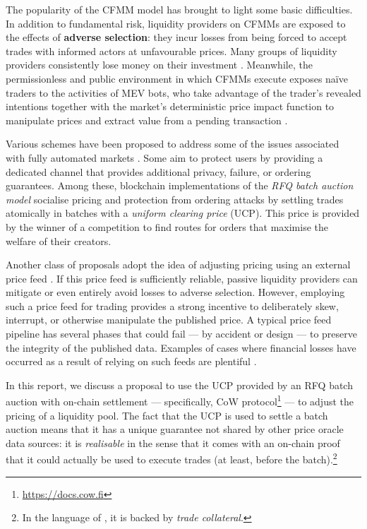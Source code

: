 \documentclass[a4paper,10pt]{article}
\theoremstyle{remark}
\begin{document}
The popularity of the CFMM model has brought to light some basic difficulties.
%
In addition to fundamental risk, liquidity providers on CFMMs are exposed to the effects of \textbf{adverse selection}: they incur losses from being forced to accept trades with informed actors at unfavourable prices.  
%
Many groups of liquidity providers consistently lose money on their investment \cite{loesch2021impermanent}.
%
Meanwhile, the permissionless and public environment in which CFMMs execute exposes na\"ive traders to the activities of MEV bots, who take advantage of the trader's revealed intentions together with the market's deterministic price impact function to manipulate prices and extract value from a pending transaction \cite{zhou2021high, holloway2023value}.

Various schemes have been proposed to address some of the issues associated with fully automated markets \cite{ferreira2022credible, josojo2022mev, nikete2022towards, fleupold2022cow}.
%
Some aim to protect users by providing a dedicated channel that provides additional privacy, failure, or ordering guarantees.
%
Among these, blockchain implementations of the \emph{RFQ batch auction model} socialise pricing and protection from ordering attacks by settling trades atomically in batches with a \emph{uniform clearing price} (UCP).
%
This price is provided by the winner of a competition to find routes for orders that maximise the welfare of their creators.

Another class of proposals adopt the idea of adjusting pricing using an external price feed \cite{dodoex,synthetixlitepaper}.
%
If this price feed is sufficiently reliable, passive liquidity providers can mitigate or even entirely avoid losses to adverse selection.
%
However, employing such a price feed for trading provides a strong incentive to deliberately skew, interrupt, or otherwise manipulate the published price.
%
A typical price feed pipeline has several phases that could fail --- by accident or design --- to preserve the integrity of the published data. 
%
Examples of cases where financial losses have occurred as a result of relying on such feeds are plentiful \cite{liu2021first, cryptocat2020how, venus2022luna, eskandari2021sok}.

In this report, we discuss a proposal to use the UCP provided by an RFQ batch auction with on-chain settlement --- specifically, CoW protocol\footnote{\url{https://docs.cow.fi}} --- to adjust the pricing of a liquidity pool.
%
The fact that the UCP is used to settle a batch auction means that it has a unique guarantee not shared by other price oracle data sources: it is \emph{realisable} in the sense that it comes with an on-chain proof that it could actually be used to execute trades (at least, before the batch).\footnote{In the language of \cite{suresh2022so}, it is backed by \emph{trade collateral}.}
\end{document}

